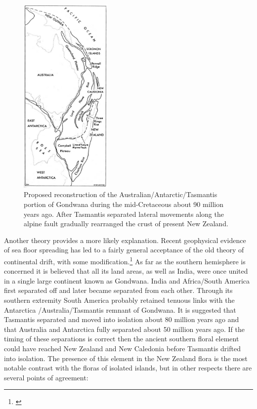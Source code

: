 \begin{figure}
	\includegraphics[width=0.4\textwidth]{graphics/figure3gondwana.jpg}
	\centering
	\caption[Proposed reconstruction of the Australian/Antarctic/Tasmantis portion of Gondwana]{Proposed reconstruction of the Australian/Antarctic/Tasmantis portion of Gondwana during the mid-Cretaceous about 90 million years ago.
After Tasmantis separated lateral movements along the alpine fault gradually rearranged the crust of present New Zealand.}%
	\label{fig:3gondwana}
\end{figure}

Another theory provides a more likely explanation.
Recent geophysical evidence of sea floor spreading has led to a fairly general acceptance of the old theory of continental drift, with some modification.\footnote{\cite{stevens1980new}}
As far as the southern hemisphere is concerned it is believed that all its land areas, as well as India, were once united in a single large continent known as Gondwana.
India and Africa/South America first separated off and later became separated from each other.
Through its southern extremity South America probably retained tenuous links with the Antarctica /Australia/Tasmantis remnant of Gondwana.
It is suggested that Tasmantis separated and moved into isolation about 80 million years ago and that Australia and Antarctica fully separated about 50 million years ago.
If the timing of these separations is correct then the ancient southern floral element could have reached New Zealand and New Caledonia before Tasmantis drifted into isolation.
The presence of this element in the New Zealand flora is the most notable contrast with the floras of isolated islands, but in other respects there are several points of agreement:

